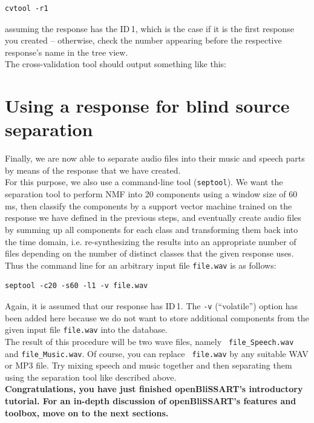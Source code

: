 \begin{verbatim}
cvtool -r1
\end{verbatim}

assuming the response has the ID\,1, which is the case if it is the first
response you created -- otherwise, check the number appearing before the
respective response's name in the tree view.\\
The cross-validation tool should output something like this:




\section{Using a response for blind source separation}

Finally, we are now able to separate audio files into their music and speech
parts by means of the response that we have created.\\

For this purpose, we also use a command-line tool ({\tt septool}). We want the
separation tool to perform NMF into 20 components using a window size of 60\,ms,
then classify the components by a support vector machine trained on the response
we have defined in the previous steps, and eventually create audio files by
summing up all components for each class and transforming them back into the
time domain, i.e. re-synthesizing the results into an appropriate number of
files depending on the number of distinct classes that the given response
uses. Thus the command line for an arbitrary input file \verb|file.wav| is as
follows:

\begin{verbatim}
septool -c20 -s60 -l1 -v file.wav
\end{verbatim}

Again, it is assumed that our response has ID\,1. The {\tt -v} (``volatile'')
option has been added here because we do not want to store additional components
from the given input file \verb|file.wav| into the database.\\

The result of this procedure will be two wave files, namely {\tt
  file\_Speech.wav} and {\tt file\_Music.wav}. Of course, you can replace {\tt
  file.wav} by any suitable WAV or MP3 file. Try mixing speech and music
together and then separating them using the separation tool like described above.\\

\noindent \textbf{Congratulations, you have just finished openBliSSART's
  introductory tutorial. For an in-depth discussion of openBliSSART's features
  and toolbox, move on to the next sections.}
